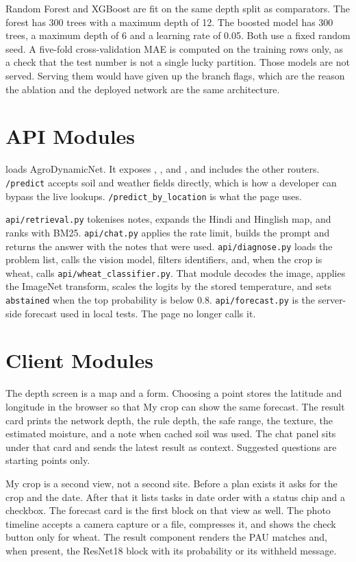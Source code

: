 Random Forest and XGBoost are fit on the same depth split as comparators. The forest has 300 trees with a maximum depth of 12. The boosted model has 300 trees, a maximum depth of 6 and a learning rate of 0.05. Both use a fixed random seed. A five-fold cross-validation MAE is computed on the training rows only, as a check that the test number is not a single lucky partition. Those models are not served. Serving them would have given up the branch flags, which are the reason the ablation and the deployed network are the same architecture.

\section{API Modules}
 loads AgroDynamicNet. It exposes , ,  and , and includes the other routers. \texttt{/predict} accepts soil and weather fields directly, which is how a developer can bypass the live lookups. \texttt{/predict\_by\_location} is what the page uses.

\texttt{api/retrieval.py} tokenises notes, expands the Hindi and Hinglish map, and ranks with BM25. \texttt{api/chat.py} applies the rate limit, builds the prompt and returns the answer with the notes that were used. \texttt{api/diagnose.py} loads the problem list, calls the vision model, filters identifiers, and, when the crop is wheat, calls \texttt{api/wheat\_classifier.py}. That module decodes the image, applies the ImageNet transform, scales the logits by the stored temperature, and sets \texttt{abstained} when the top probability is below 0.8. \texttt{api/forecast.py} is the server-side forecast used in local tests. The page no longer calls it.

\section{Client Modules}
The depth screen is a map and a form. Choosing a point stores the latitude and longitude in the browser so that My crop can show the same forecast. The result card prints the network depth, the rule depth, the safe range, the texture, the estimated moisture, and a note when cached soil was used. The chat panel sits under that card and sends the latest result as context. Suggested questions are starting points only.

My crop is a second view, not a second site. Before a plan exists it asks for the crop and the date. After that it lists tasks in date order with a status chip and a checkbox. The forecast card is the first block on that view as well. The photo timeline accepts a camera capture or a file, compresses it, and shows the check button only for wheat. The result component renders the PAU matches and, when present, the ResNet18 block with its probability or its withheld message.

